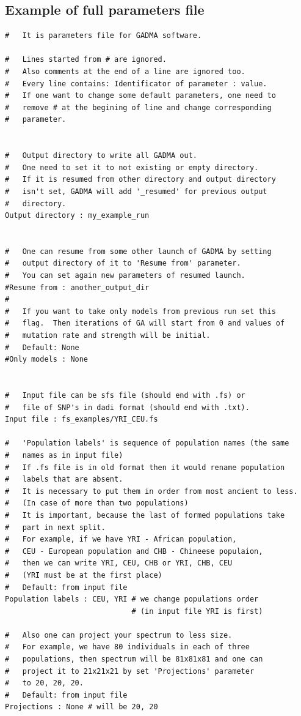 \documentclass[12pt]{article}
\begin{document}
\newpage
\begin{appendices}
\section{Example of full parameters file}
\label{sec:example-params}
\begin{lstlisting}
#	It is parameters file for GADMA software.

#   Lines started from # are ignored.
#   Also comments at the end of a line are ignored too.
#   Every line contains: Identificator of parameter : value.
#   If one want to change some default parameters, one need to
#   remove # at the begining of line and change corresponding
#   parameter.


#   Output directory to write all GADMA out.
#   One need to set it to not existing or empty directory.
#   If it is resumed from other directory and output directory 
#   isn't set, GADMA will add '_resumed' for previous output 
#   directory.
Output directory : my_example_run


#   One can resume from some other launch of GADMA by setting
#   output directory of it to 'Resume from' parameter.
#   You can set again new parameters of resumed launch.
#Resume from : another_output_dir
#
#	If you want to take only models from previous run set this 
#	flag.  Then iterations of GA will start from 0 and values of
#	mutation rate and strength will be initial.
#	Default: None
#Only models : None


#   Input file can be sfs file (should end with .fs) or 
#   file of SNP's in dadi format (should end with .txt).
Input file : fs_examples/YRI_CEU.fs

#   'Population labels' is sequence of population names (the same
#   names as in input file)
#   If .fs file is in old format then it would rename population 
#   labels that are absent.
#   It is necessary to put them in order from most ancient to less. 
#   (In case of more than two populations)
#   It is important, because the last of formed populations take
#   part in next split.
#   For example, if we have YRI - African population,
#   CEU - European population and CHB - Chineese populaion,
#   then we can write YRI, CEU, CHB or YRI, CHB, CEU 
#   (YRI must be at the first place)
#   Default: from input file
Population labels : CEU, YRI # we change populations order 
                             # (in input file YRI is first)

#   Also one can project your spectrum to less size.
#   For example, we have 80 individuals in each of three 
#   populations, then spectrum will be 81x81x81 and one can 
#   project it to 21x21x21 by set 'Projections' parameter 
#   to 20, 20, 20.
#   Default: from input file
Projections : None # will be 20, 20





\end{lstlisting}
\end{appendices}
\end{document}
